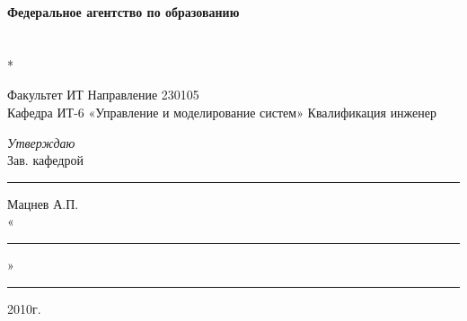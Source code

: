 
\begin{center}
\textbf{Федеральное агентство по образованию} \\
\vspace{0.5cm}
\\
\\*
\end{center}

\begin{center}
Факультет ИТ  Направление 230105 \\
Кафедра ИТ-6 «Управление и моделирование систем» Квалификация инженер \\
\end{center}

\begin{flushright}
\textit{Утверждаю} \\
Зав. кафедрой \\
\rule{2.9cm}{0.5pt} Мацнев А.П. \\
«\rule{1cm}{0.5pt}»\rule{3cm}{0.5pt} 2010г.
\end{flushright}

\vfill
